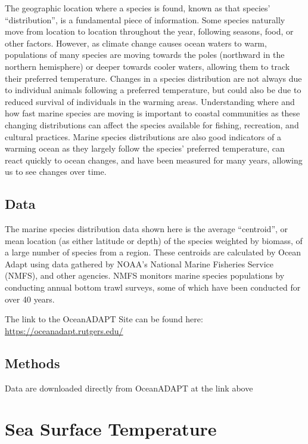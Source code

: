 \documentclass[
]{book}
\begin{document}
The geographic location where a species is found, known as that species' ``distribution'', is a fundamental piece of information. Some species naturally move from location to location throughout the year, following seasons, food, or other factors. However, as climate change causes ocean waters to warm, populations of many species are moving towards the poles (northward in the northern hemisphere) or deeper towards cooler waters, allowing them to track their preferred temperature. Changes in a species distribution are not always due to individual animals following a preferred temperature, but could also be due to reduced survival of individuals in the warming areas. Understanding where and how fast marine species are moving is important to coastal communities as these changing distributions can affect the species available for fishing, recreation, and cultural practices. Marine species distributions are also good indicators of a warming ocean as they largely follow the species' preferred temperature, can react quickly to ocean changes, and have been measured for many years, allowing us to see changes over time.

\hypertarget{data-6}{%
\section{Data}\label{data-6}}

The marine species distribution data shown here is the average ``centroid'', or mean location (as either latitude or depth) of the species weighted by biomass, of a large number of species from a region. These centroids are calculated by Ocean Adapt using data gathered by NOAA's National Marine Fisheries Service (NMFS), and other agencies. NMFS monitors marine species populations by conducting annual bottom trawl surveys, some of which have been conducted for over 40 years.

The link to the OceanADAPT Site can be found here: \url{https://oceanadapt.rutgers.edu/}

\hypertarget{methods-5}{%
\section{Methods}\label{methods-5}}

Data are downloaded directly from OceanADAPT at the link above

\hypertarget{sea-surface-temperature}{%
\chapter{Sea Surface Temperature}\label{sea-surface-temperature}}
\end{document}
